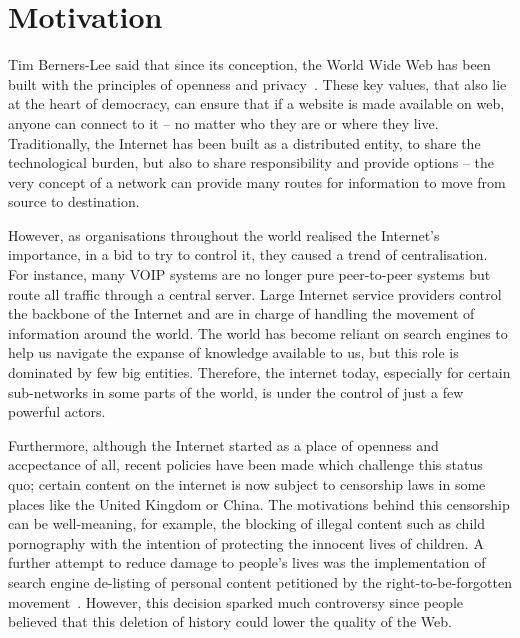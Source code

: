 \documentclass[ %
                    author={Samuel Russell},
                supervisor={Prof. Bogdan Warinschi},
                    degree={MEng},
                     title={Innocuous Ciphertexts},
                  subtitle={The DE-CENSOR Scheme},
                      type={Research},
                      year={2018} ]{dissertation}
\begin{document}

\chapter{Motivation}
\label{chap:context}

Tim Berners-Lee said that since its conception, the World Wide Web has been built with the principles of openness and privacy~\cite{gard}.
These key values, that also lie at the heart of democracy, can ensure that if a website is made available on web, anyone can connect to it -- no matter who they are or where they live.
Traditionally, the Internet has been built as a distributed entity, to share the technological burden, but also to share responsibility and provide options -- the very concept of a network can provide many routes for information to move from source to destination.

However, as organisations throughout the world realised the Internet's importance, in a bid to try to control it, they caused a trend of centralisation.
For instance, many VOIP systems are no longer pure peer-to-peer systems but route all traffic through a central server.
Large Internet service providers control the backbone of the Internet and are in charge of handling the movement of information around the world.
The world has become reliant on search engines to help us navigate the expanse of knowledge available to us, but this role is dominated by few big entities.
Therefore, the internet today, especially for certain sub-networks in some parts of the world, is under the control of just a few powerful actors.

Furthermore, although the Internet started as a place of openness and accpectance of all, recent policies have been made which challenge this status quo; certain content on the internet is now subject to censorship laws in some places like the United Kingdom or China. The motivations behind this censorship can be well-meaning, for example, the blocking of illegal content such as child pornography with the intention of protecting the innocent lives of children. A further attempt to reduce damage to people's lives was the implementation of search engine de-listing of personal content petitioned by the right-to-be-forgotten movement~\cite{rtbf}. However, this decision sparked much controversy since people believed that this deletion of history could lower the quality of the Web.
\end{document}

